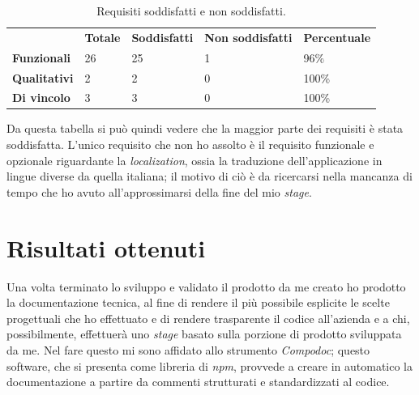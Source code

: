 \begin{table}[h]
  \label{tab:totale-requisiti-soddifatti}
  \begin{center}
    \begin{tabularx}{\textwidth}{lllll}
& \textbf{Totale}         & \textbf{Soddisfatti}    & \textbf{Non soddisfatti} & \textbf{Percentuale}       \\ \cline{2-5}
\multicolumn{1}{l|}{\textbf{Funzionali}}  & \multicolumn{1}{l|}{26} & \multicolumn{1}{l|}{25} & \multicolumn{1}{l|}{1}   & \multicolumn{1}{l|}{96\%}  \\ \cline{2-5}
\multicolumn{1}{l|}{\textbf{Qualitativi}} & \multicolumn{1}{l|}{2}  & \multicolumn{1}{l|}{2}  & \multicolumn{1}{l|}{0}   & \multicolumn{1}{l|}{100\%} \\ \cline{2-5}
\multicolumn{1}{l|}{\textbf{Di vincolo}}  & \multicolumn{1}{l|}{3}  & \multicolumn{1}{l|}{3}  & \multicolumn{1}{l|}{0}   & \multicolumn{1}{l|}{100\%} \\ \cline{2-5}
\end{tabularx}
\end{center}
\caption{Requisiti soddisfatti e non soddisfatti.}
\end{table}

Da questa tabella si può quindi vedere che la maggior parte dei requisiti è stata soddisfatta. L'unico requisito che non ho assolto è il requisito funzionale e opzionale riguardante la \textit{localization}, ossia la traduzione dell'applicazione in lingue diverse da quella italiana; il motivo di ciò è da ricercarsi nella mancanza di tempo che ho avuto all'approssimarsi della fine del mio \textit{stage}.


\section{Risultati ottenuti}

Una volta terminato lo sviluppo e validato il prodotto da me creato ho prodotto la documentazione tecnica, al fine di rendere il più possibile esplicite le scelte progettuali che ho effettuato e di rendere trasparente il codice all'azienda e a chi, possibilmente, effettuerà uno \textit{stage} basato sulla porzione di prodotto sviluppata da me. Nel fare questo mi sono affidato allo strumento \textit{Compodoc}; questo software, che si presenta come libreria di \textit{npm}, provvede a creare in automatico la documentazione a partire da commenti strutturati e standardizzati al codice.\\

